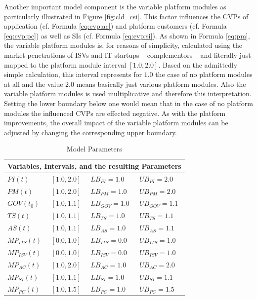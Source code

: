 Another important model component is the variable platform modules as particularly illustrated in Figure \ref{fig:cld_csi}. This factor influences the \acp{CVP} of application (cf. Formula \ref{eq:cvp:ac}) and platform customers (cf. Formula \ref{eq:cvp:pc}) as well as \acp{SI} (cf. Formula \ref{eq:cvp:si}). As shown in Formula \ref{eq:pm}, the variable platform modules is, for reasons of simplicity, calculated using the market penetrations of \acp{ISV} and \ac{IT} startups -- complementors -- and literally just mapped to the platform module interval $[1.0,2.0]$. Based on the admittedly simple calculation, this interval represents for $1.0$ the case of no platform modules at all and the value $2.0$ means basically just various platform modules. Also the variable platform modules is used multiplicative and therefore this interpretation. Setting the lower boundary below one would mean that in the case of no platform modules the influenced \acp{CVP} are effected negative. As with the platform improvements, the overall impact of the variable platform modules can be adjusted by changing the corresponding upper boundary.

\begin{table}[t]
	\centering
	\begin{tabular}{llll}
			\toprule 
			\multicolumn{4}{c}{\footnotesize \textbf{Variables, Intervals, and the resulting Parameters}}\\ \midrule
			\footnotesize $PI(t)$ & \footnotesize $[1.0,2.0]$ & \footnotesize $LB_{PI} = 1.0$ & \footnotesize $UB_{PI} = 2.0$ \\ 
			\footnotesize $PM(t)$ & \footnotesize  $[1.0,2.0]$ & \footnotesize $LB_{PM} = 1.0$ & \footnotesize $UB_{PM} = 2.0$ \\ \midrule
			\footnotesize $GOV(t_0)$ & \footnotesize $[1.0,1.1]$ & \footnotesize $LB_{GOV} = 1.0$ & \footnotesize $UB_{GOV} = 1.1$ \\
			\footnotesize $TS(t)$ & \footnotesize $[1.0,1.1]$ & \footnotesize $LB_{TS} = 1.0$ & \footnotesize $UB_{TS} = 1.1$ \\
			\footnotesize $AS(t)$ & \footnotesize $[1.0,1.1]$ & \footnotesize $LB_{AS} = 1.0$ & \footnotesize $UB_{AS} = 1.1$ \\ \midrule
			\footnotesize $MP_{ITS}(t)$ & \footnotesize $[0.0,1.0]$ & \footnotesize $LB_{ITS} = 0.0$ & \footnotesize $UB_{ITS} = 1.0$ \\
			\footnotesize $MP_{ISV}(t)$ & \footnotesize $[0.0,1.0]$ & \footnotesize $LB_{ISV} = 0.0$ & \footnotesize $UB_{ISV} = 1.0$ \\
			\footnotesize $MP_{AC}(t)$ & \footnotesize $[1.0,2.0]$ & \footnotesize $LB_{AC} = 1.0$ & \footnotesize $UB_{AC} = 2.0$ \\
			\footnotesize $MP_{SI}(t)$ & \footnotesize $[1.0,1.1]$ & \footnotesize $LB_{SI} = 1.0$ & \footnotesize $UB_{SI} = 1.1$ \\
			\footnotesize $MP_{PC}(t)$ & \footnotesize $[1.0,1.5]$ & \footnotesize $LB_{PC} = 1.0$ & \footnotesize $UB_{PC} = 1.5$ \\ \bottomrule
	\end{tabular}
	\caption{Model Parameters}
	\label{tab:mpara}
\end{table}

